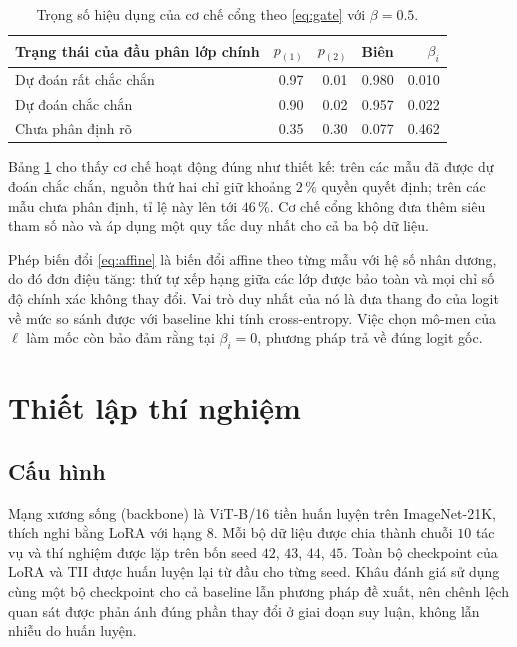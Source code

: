 \documentclass[11pt,a4paper]{article}
\begin{document}
\begin{table}[htbp]
\centering
\caption{Trọng số hiệu dụng của cơ chế cổng theo \eqref{eq:gate} với
$\beta = 0.5$.}
\label{tab:gate-example}
\begin{tabular}{@{}lrrrr@{}}
\toprule
Trạng thái của đầu phân lớp chính & $p_{(1)}$ & $p_{(2)}$ & Biên & $\beta_i$ \\
\midrule
Dự đoán rất chắc chắn   & 0.97 & 0.01 & 0.980 & 0.010 \\
Dự đoán chắc chắn       & 0.90 & 0.02 & 0.957 & 0.022 \\
Chưa phân định rõ       & 0.35 & 0.30 & 0.077 & 0.462 \\
\bottomrule
\end{tabular}
\end{table}

Bảng \ref{tab:gate-example} cho thấy cơ chế hoạt động đúng như thiết kế: trên các
mẫu đã được dự đoán chắc chắn, nguồn thứ hai chỉ giữ khoảng $2\,\%$ quyền quyết
định; trên các mẫu chưa phân định, tỉ lệ này lên tới $46\,\%$. Cơ chế cổng không
đưa thêm siêu tham số nào và áp dụng một quy tắc duy nhất cho cả ba bộ dữ liệu.

Phép biến đổi \eqref{eq:affine} là biến đổi affine theo từng mẫu với hệ số nhân
dương, do đó đơn điệu tăng: thứ tự xếp hạng giữa các lớp được bảo toàn và mọi
chỉ số độ chính xác không thay đổi. Vai trò duy nhất của nó là đưa thang đo của
logit về mức so sánh được với baseline khi tính cross-entropy. Việc chọn mô-men
của $\ell$ làm mốc còn bảo đảm rằng tại $\beta_i = 0$, phương pháp trả về đúng
logit gốc.

\section{Thiết lập thí nghiệm}

\subsection{Cấu hình}

Mạng xương sống (backbone) là ViT-B/16 tiền huấn luyện trên ImageNet-21K, thích
nghi bằng LoRA với hạng $8$. Mỗi bộ dữ liệu được chia thành chuỗi $10$ tác vụ và
thí nghiệm được lặp trên bốn seed $42$, $43$, $44$, $45$. Toàn bộ checkpoint của
LoRA và TII được huấn luyện lại từ đầu cho từng seed. Khâu đánh giá sử dụng cùng
một bộ checkpoint cho cả baseline lẫn phương pháp đề xuất, nên chênh lệch quan
sát được phản ánh đúng phần thay đổi ở giai đoạn suy luận, không lẫn nhiễu do
huấn luyện.
\end{document}
